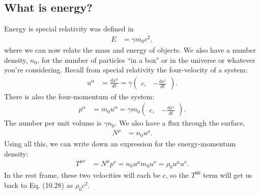 \documentclass[a4paper, 11pt, normalem]{report}
\begin{document}
\section{What is energy?}
Energy is special relativity was defined in
\begin{align}
    E &= \gamma m_0c^2,
\end{align}
where we can now relate the mass and energy of objects.
We also have a number density, $n_0$, for the number of particles ``in a box" or in the universe or whatever you're considering. 
Recall from special relativity the four-velocity of a system:
\begin{align}
    u^\alpha &= \frac{dx^\alpha}{dt} = \gamma\begin{pmatrix} c, & -\frac{dx^i}{dt}\end{pmatrix}.
\end{align}
There is also the four-momentum of the system:
\begin{align}
    p^\alpha &= m_0u^\alpha = \gamma m_0\begin{pmatrix} c, & -\frac{dx^i}{dt} \end{pmatrix}.
\end{align}
The number per unit volume is $\gamma n_0$.
We also have a flux through the surface,
\begin{align}
    N^\rho &= n_0u^\rho.
\end{align}
Using all this, we can write down an expression for the energy-momentum density:
\begin{align}
    T^{\mu\nu} &= N^\mu p^\nu = n_0u^\mu m_0u^\nu = \rho_0 u^\mu u^\nu.
\end{align}
In the rest frame, these two velocities will each be $c$, so the $T^{00}$ term will get us back to Eq. (10.28) as $\rho_0 c^2$.

\chapter{}

\chapter{}

\chapter{}

\chapter{}
\end{document}
